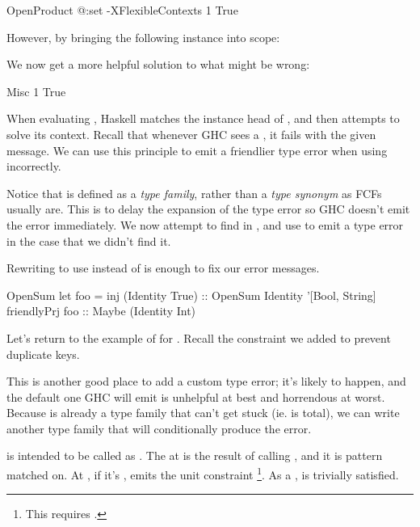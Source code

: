 \documentclass[book.tex]{subfiles}
\begin{document}
\begin{dorepl}{OpenProduct}
@:set -XFlexibleContexts
1 True
\end{dorepl}

However, by bringing the following instance into scope:


We now get a more helpful solution to what might be wrong:

\begin{dorepl}{Misc}
1 True
\end{dorepl}

When evaluating , Haskell matches the instance head of , and then attempts to solve its context. Recall that whenever GHC sees a
, it fails with the given message. We can use this principle to
emit a friendlier type error when using  incorrectly.


Notice that  is defined as a \emph{type family}, rather
than a \emph{type synonym} as FCFs usually are. This is to delay the expansion
of the type error so GHC doesn't emit the error immediately. We now attempt to
find  in , and use  to emit a type error in the case
that we didn't find it.

Rewriting  to use  instead of
 is enough to fix our error messages.

\begin{dorepl}{OpenSum}
let foo = inj (Identity True) :: OpenSum Identity '[Bool, String]
friendlyPrj foo :: Maybe (Identity Int)
\end{dorepl}

Let's return to the example of  for . Recall the
 constraint we added to prevent duplicate keys.


This is another good place to add a custom type error; it's likely to happen,
and the default one GHC will emit is unhelpful at best and horrendous at worst.
Because  is already a type family that can't get stuck (ie. is
total), we can write another type family that will conditionally produce the
error.


 is intended to be called as . The  at  is the result of
calling , and it is pattern matched on. At , if it's
,  emits the unit constraint \ty{()}
\footnote{This requires .}. As a ,
\ty{()} is trivially satisfied.
\end{document}
